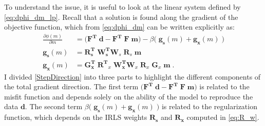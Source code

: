 To understand the issue, it is useful to look at the linear system defined by \ref{eq:dphi_dm_lp}. 
Recall that a solution is found along the gradient of the objective function, which from \eqref{eq:dphi_dm} can be written explicitly as:
\begin{equation}\label{StepDirection}
\begin{split}
\frac{\partial \phi(m)}{\partial m} &= \big(\mathbf{F^T\;d} - \mathbf{F^T\;F\;m}\big) - \beta\big (\;  \mathbf{g_s}(m) + \mathbf{g_x}(m)\;\big ) \\
\mathbf{g_s}(m) &=  \mathbf{R_{\text{s}}^T}\; \mathbf{W_{\text{s}}^T} \mathbf{W}_s \;\mathbf{ R}_s\; \mathbf{m}\\
\mathbf{g_x}(m) &=  \mathbf{G_{\text{x}}^T} \;\mathbf{R^T}_x\; \mathbf{W_{\text{x}}^T}\mathbf{W}_x \;\mathbf{R}_x \; \mathbf{G}_x\; \mathbf{m} \;.
\end{split}
\end{equation}
I divided \eqref{StepDirection} into three parts to highlight the different components of the total gradient direction.
The first term $\big(\mathbf{F^T\;d} - \mathbf{F^T\;F\;m}\big)$ is related to the misfit function and depends solely on the ability of the model to reproduce the data $\mathbf{d}$. 
The second term $ \beta\big (\;  \mathbf{g_s}(m) + \mathbf{g_x}(m)\;\big )$ is related to the regularization function, which depends on the IRLS weights $\mathbf{R_s}$ and $\mathbf{R_x}$ computed in \ref{eq:R_w}.

